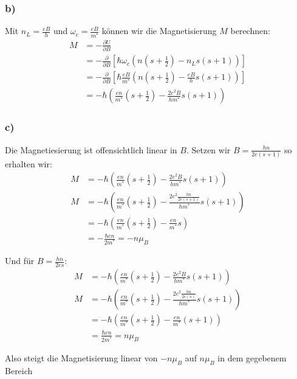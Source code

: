 \subsubsection*{b)}
Mit $n_L = \frac{eB}{h}$ und $\omega_c = \frac{eB}{m^*}$ können wir die Magnetisierung $M$ berechnen:
\begin{align*}
M &= - \frac{\partial U}{\partial B}\\
 &= - \frac{\partial}{\partial B} \left[\hbar\omega_c\left(n\left(s+\frac 12\right)-n_L s(s+1)\right)\right] \\
 &= - \frac{\partial}{\partial B} \left[\hbar\frac{eB}{m^*}\left(n\left(s+\frac 12\right)-\frac{eB}{h} s(s+1)\right)\right]\\
 &= - \hbar\left(\frac{en}{m^*}\left(s+\frac 12\right)-\frac{2e^2B}{hm^*} s(s+1)\right)
\end{align*}

\subsubsection*{c)}
Die Magnetiesierung ist offensichtlich linear in $B$. Setzen wir $B = \frac{hn}{2e(s+1)}$ so erhalten wir:
\begin{align*}
M &= -\hbar\left(\frac{en}{m^*}\left(s+\frac 12\right)-\frac{2e^2B}{hm^*} s(s+1)\right)\\
M &= -\hbar\left(\frac{en}{m^*}\left(s+\frac 12\right)-\frac{2e^2\frac{hn}{2e(s+1)}}{hm^*} s(s+1)\right) \\
&= -\hbar\left(\frac{en}{m^*}\left(s+\frac 12\right) - \frac{en}{m^*}s\right)\\
&= -\frac{\hbar en}{2m^*} = -n \mu_B
\end{align*}

Und für $B = \frac{hn}{2es}$:
\begin{align*}
M &= -\hbar\left(\frac{en}{m^*}\left(s+\frac 12\right)-\frac{2e^2B}{hm^*} s(s+1)\right)\\
M &= -\hbar\left(\frac{en}{m^*}\left(s+\frac 12\right)-\frac{2e^2\frac{hn}{2e(s)}}{hm^*} s(s+1)\right) \\
&= -\hbar\left(\frac{en}{m^*}\left(s+\frac 12\right) - \frac{en}{m^*}(s+1)\right)\\
&= \frac{\hbar en}{2m^*} = n \mu_B
\end{align*}

Also steigt die Magnetisierung linear von $-n \mu_B$ auf $n \mu_B$ in dem gegebenem Bereich
